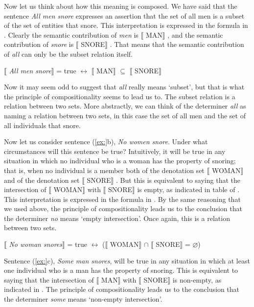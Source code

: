 Now let us think about how this meaning is composed. We have said that the sentence \textit{All men snore} expresses an assertion that the set of all men is a subset of the set of entities that snore. This interpretation is expressed in the formula in . Clearly the semantic contribution of \textit{men} is $\llbracket$ MAN$\rrbracket$ , and the semantic contribution of \textit{snore} is $\llbracket$ SNORE$\rrbracket$ . That means that the semantic contribution of \textit{all} can only be the subset relation itself.


\ea
{}$\llbracket$ \textit{All men snore}$\rrbracket$  = true $\leftrightarrow $ $\llbracket$ MAN$\rrbracket$  ${\subseteq}$ $\llbracket$ SNORE$\rrbracket$ 
\z


Now it may seem odd to suggest that \textit{all} really means ‘subset’, but that is what the principle of compositionality seems to lead us to. The subset relation is a relation between two sets. More abstractly, we can think of the determiner \textit{all} as naming a relation between two sets, in this case the set of all men and the set of all individuals that snore.



Now let us consider sentence (\ref{ex:}b), \textit{No women snore}. Under what circumstances will this sentence be true? Intuitively, it will be true in any situation in which no individual who is a woman has the property of snoring; that is, when no individual is a member both of the denotation set $\llbracket$ WOMAN$\rrbracket$  and of the denotation set $\llbracket$ SNORE$\rrbracket$ . But this is equivalent to saying that the intersection of $\llbracket$ WOMAN$\rrbracket$  with $\llbracket$ SNORE$\rrbracket$  is empty, as indicated in table  of . This interpretation is expressed in the formula in . By the same reasoning that we used above, the principle of compositionality leads us to the conclusion that the determiner \textit{no} means ‘empty intersection’. Once again, this is a relation between two sets.


\ea
{}$\llbracket$ \textit{No woman snores}$\rrbracket$  = true $\leftrightarrow $ ($\llbracket$ WOMAN$\rrbracket$  ${\cap}$ $\llbracket$ SNORE$\rrbracket$  = ⌀)
\z


Sentence (\ref{ex:}c), \textit{Some man snores}, will be true in any situation in which at least one individual who is a man has the property of snoring. This is equivalent to saying that the intersection of $\llbracket$ MAN$\rrbracket$  with $\llbracket$ SNORE$\rrbracket$  is non-empty, as indicated in . The principle of compositionality leads us to the conclusion that the determiner \textit{some} means ‘non-empty intersection’.


